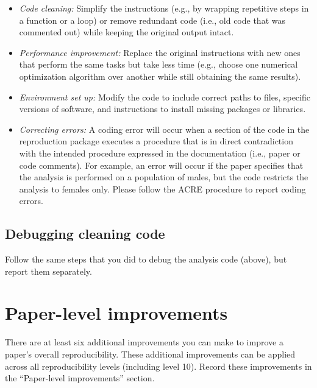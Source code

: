 \documentclass[
]{book}
\providecommand{\tightlist}{%
  \setlength{\itemsep}{0pt}\setlength{\parskip}{0pt}}
\begin{document}
\begin{itemize}
\tightlist
\item
  \emph{Code cleaning:} Simplify the instructions (e.g., by wrapping repetitive steps in a function or a loop) or remove redundant code (i.e., old code that was commented out) while keeping the original output intact.\\
\item
  \emph{Performance improvement:} Replace the original instructions with new ones that perform the same tasks but take less time (e.g., choose one numerical optimization algorithm over another while still obtaining the same results).\\
\item
  \emph{Environment set up:} Modify the code to include correct paths to files, specific versions of software, and instructions to install missing packages or libraries.\\
\item
  \emph{Correcting errors:} A coding error will occur when a section of the code in the reproduction package executes a procedure that is in direct contradiction with the intended procedure expressed in the documentation (i.e., paper or code comments). For example, an error will occur if the paper specifies that the analysis is performed on a population of males, but the code restricts the analysis to females only. Please follow the ACRE procedure to report coding errors.
\end{itemize}

\hypertarget{debugging-cleaning-code}{%
\subsection{Debugging cleaning code}\label{debugging-cleaning-code}}

Follow the same steps that you did to debug the analysis code (above), but report them separately.

\hypertarget{paper-level}{%
\section{Paper-level improvements}\label{paper-level}}

There are at least six additional improvements you can make to improve a paper's overall reproducibility. These additional improvements can be applied across all reproducibility levels (including level 10). Record these improvements in the ``Paper-level improvements'' section.
\end{document}
